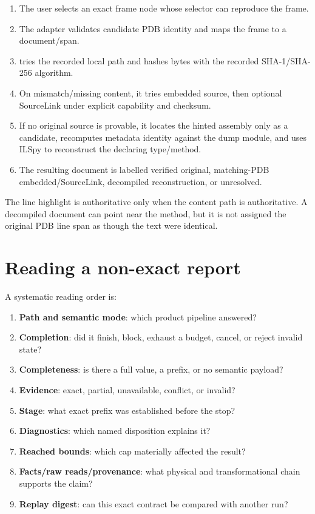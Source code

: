 \documentclass[11pt,oneside,openany]{book}
\newcommand{\typeName}[1]{\texttt{\detokenize{#1}}}
\begin{document}
\begin{enumerate}
  \item The user selects an exact frame node whose selector can reproduce the frame.
  \item The adapter validates candidate PDB identity and maps the frame to a document/span.
  \item \typeName{SourceNavigationService} tries the recorded local path and hashes bytes with the recorded SHA-1/SHA-256 algorithm.
  \item On mismatch/missing content, it tries embedded source, then optional SourceLink under explicit capability and checksum.
  \item If no original source is provable, it locates the hinted assembly only as a candidate, recomputes metadata identity against the dump module, and uses ILSpy to reconstruct the declaring type/method.
  \item The resulting document is labelled verified original, matching-PDB embedded/SourceLink, decompiled reconstruction, or unresolved.
\end{enumerate}

The line highlight is authoritative only when the content path is authoritative. A decompiled document can point near the method, but it is not assigned the original PDB line span as though the text were identical.

\section{Reading a non-exact report}

A systematic reading order is:

\begin{enumerate}
  \item \textbf{Path and semantic mode}: which product pipeline answered?
  \item \textbf{Completion}: did it finish, block, exhaust a budget, cancel, or reject invalid state?
  \item \textbf{Completeness}: is there a full value, a prefix, or no semantic payload?
  \item \textbf{Evidence}: exact, partial, unavailable, conflict, or invalid?
  \item \textbf{Stage}: what exact prefix was established before the stop?
  \item \textbf{Diagnostics}: which named disposition explains it?
  \item \textbf{Reached bounds}: which cap materially affected the result?
  \item \textbf{Facts/raw reads/provenance}: what physical and transformational chain supports the claim?
  \item \textbf{Replay digest}: can this exact contract be compared with another run?
\end{enumerate}
\end{document}
